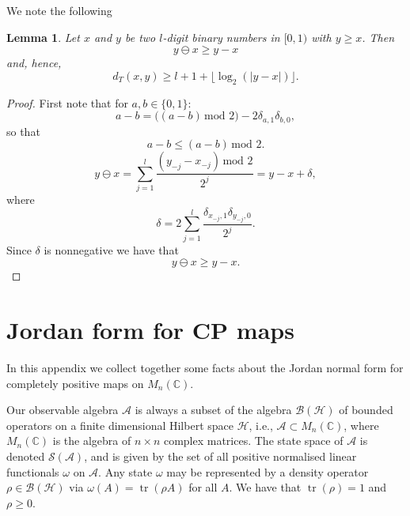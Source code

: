 \documentclass[11pt,oneside]{amsart}
\DeclareMathOperator{\tr}{tr}
\theoremstyle{plain}%
\newtheorem{lemma}[theorem]{Lemma}
\theoremstyle{definition}
\theoremstyle{remark}
\begin{document}
We note the following
\begin{lemma}
	Let $x$ and $y$ be two $l$-digit binary numbers in $[0, 1)$ with $y\ge x$. Then
	\begin{equation}
		y\ominus x \ge y-x
	\end{equation}
	and, hence,
	\begin{equation}
		d_T(x,y) \ge l+1+\lfloor \log_2(|y-x|) \rfloor.
	\end{equation}
\end{lemma}
\begin{proof}
	First note that for $a,b\in \{0,1\}$:
	\begin{equation}
		a-b = \bigl((a-b)\, \text{mod $2$}\bigr) - 2\delta_{a,1}\delta_{b,0},
	\end{equation}
	so that
	\begin{equation}
		a-b \le (a-b)\, \text{mod $2$}.
	\end{equation}
	\begin{equation}
		y\ominus x = \sum_{j=1}^l \frac{(y_{-j}-x_{-j})\, \text{mod $2$}}{2^{j}} = y-x + \delta,
	\end{equation}
	where
	\begin{equation}
		\delta = 2\sum_{j=1}^l \frac{\delta_{x_{-j},1}\delta_{y_{-j},0}}{2^{j}}.
	\end{equation}
	Since $\delta$ is nonnegative we have that
	\begin{equation}
		y\ominus x \ge y-x.
	\end{equation}
\end{proof}

\section{Jordan form for CP maps}\label{app:jordan}

In this appendix we collect together some facts about the Jordan normal form for completely positive maps on $M_n(\mathbb{C})$.

Our observable algebra $\mathcal{A}$ is always a subset of the algebra $\mathcal{B}(\mathcal{H})$ of bounded operators on a finite dimensional Hilbert space $\mathcal{H}$, i.e., $\mathcal{A}\subset M_n(\mathbb{C})$, where $M_n(\mathbb{C})$ is the algebra of $n\times n$ complex matrices. The state space of $\mathcal{A}$ is denoted $\mathcal{S}(\mathcal{A})$, and is given by the set of all positive normalised linear functionals $\omega$ on $\mathcal{A}$.  Any state $\omega$ may be represented by a density operator $\rho \in \mathcal{B}(\mathcal{H})$ via $\omega(A) = \tr(\rho A)$ for all $A$. We have that $\tr(\rho) = 1$ and $\rho \ge 0$.
\end{document}
